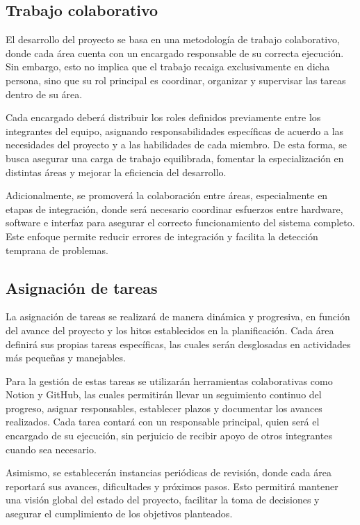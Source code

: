 \documentclass[letterpaper,11pt]{article}
\begin{document}
\subsection{Trabajo colaborativo}

El desarrollo del proyecto se basa en una metodología de trabajo colaborativo, donde cada área cuenta con un encargado responsable de su correcta ejecución. Sin embargo, esto no implica que el trabajo recaiga exclusivamente en dicha persona, sino que su rol principal es coordinar, organizar y supervisar las tareas dentro de su área.

Cada encargado deberá distribuir los roles definidos previamente entre los integrantes del equipo, asignando responsabilidades específicas de acuerdo a las necesidades del proyecto y a las habilidades de cada miembro. De esta forma, se busca asegurar una carga de trabajo equilibrada, fomentar la especialización en distintas áreas y mejorar la eficiencia del desarrollo.

Adicionalmente, se promoverá la colaboración entre áreas, especialmente en etapas de integración, donde será necesario coordinar esfuerzos entre hardware, software e interfaz para asegurar el correcto funcionamiento del sistema completo. Este enfoque permite reducir errores de integración y facilita la detección temprana de problemas.

\subsection{Asignación de tareas}

La asignación de tareas se realizará de manera dinámica y progresiva, en función del avance del proyecto y los hitos establecidos en la planificación. Cada área definirá sus propias tareas específicas, las cuales serán desglosadas en actividades más pequeñas y manejables.

Para la gestión de estas tareas se utilizarán herramientas colaborativas como Notion y GitHub, las cuales permitirán llevar un seguimiento continuo del progreso, asignar responsables, establecer plazos y documentar los avances realizados. Cada tarea contará con un responsable principal, quien será el encargado de su ejecución, sin perjuicio de recibir apoyo de otros integrantes cuando sea necesario.

Asimismo, se establecerán instancias periódicas de revisión, donde cada área reportará sus avances, dificultades y próximos pasos. Esto permitirá mantener una visión global del estado del proyecto, facilitar la toma de decisiones y asegurar el cumplimiento de los objetivos planteados.
\end{document}
